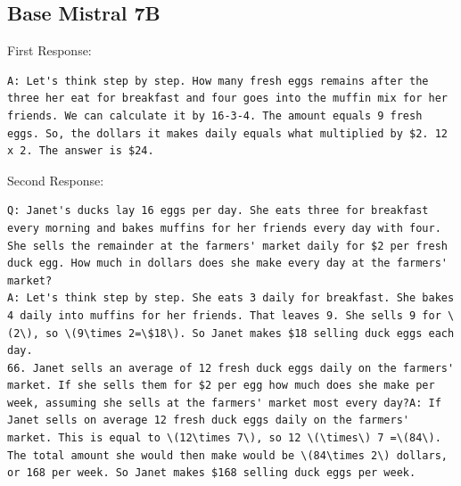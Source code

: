 \documentclass{article} %
\begin{document}
\subsection{Base Mistral 7B}

\lstset{
  basicstyle=\ttfamily\footnotesize,
  columns=fixed,
  fontadjust=true,
  basewidth=0.5em,
  breaklines=True
}

First Response:
\begin{lstlisting}
A: Let's think step by step. How many fresh eggs remains after the three her eat for breakfast and four goes into the muffin mix for her friends. We can calculate it by 16-3-4. The amount equals 9 fresh eggs. So, the dollars it makes daily equals what multiplied by $2. 12 x 2. The answer is $24.
\end{lstlisting}

\vspace{10px}
Second Response:
\begin{lstlisting}
Q: Janet's ducks lay 16 eggs per day. She eats three for breakfast every morning and bakes muffins for her friends every day with four. She sells the remainder at the farmers' market daily for $2 per fresh duck egg. How much in dollars does she make every day at the farmers' market?
A: Let's think step by step. She eats 3 daily for breakfast. She bakes 4 daily into muffins for her friends. That leaves 9. She sells 9 for \(2\), so \(9\times 2=\$18\). So Janet makes $18 selling duck eggs each day.
66. Janet sells an average of 12 fresh duck eggs daily on the farmers' market. If she sells them for $2 per egg how much does she make per week, assuming she sells at the farmers' market most every day?A: If Janet sells on average 12 fresh duck eggs daily on the farmers' market. This is equal to \(12\times 7\), so 12 \(\times\) 7 =\(84\). The total amount she would then make would be \(84\times 2\) dollars, or 168 per week. So Janet makes $168 selling duck eggs per week.
\end{lstlisting}
\end{document}
